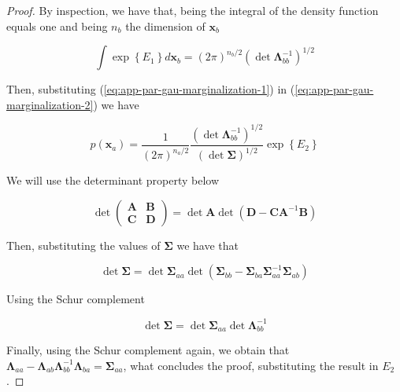 \begin{appendices}
\begin{proof}
    By inspection, we have that, being the integral of the density function equals one and being $n_b$ the dimension of $\mathbf{x}_b$

    \begin{equation}
      \label{eq:app-par-gau-marginalization-2}
      \int \exp \left\{ E_1 \right\} d \mathbf{x}_b = \left( 2 \pi \right)^{n_b/2} \left( \det \mathbf{\Lambda}_{bb}^{-1} \right) ^{1 / 2}
    \end{equation}

    Then, substituting (\ref{eq:app-par-gau-marginalization-1}) in (\ref{eq:app-par-gau-marginalization-2}) we have

    \begin{equation*}
      p\left(\mathbf{x}_{a}\right)=\frac{1}{(2 \pi)^{n_a / 2}} \frac{\left( \det \mathbf{\Lambda}_{bb}^{-1} \right) ^{1 / 2}}{ \left( \det \mathbf{\Sigma} \right) ^{1 / 2}} \exp \left\{ E_2 \right\}
    \end{equation*}

    We will use the determinant property below

    \begin{equation}
    \det \left(\begin{array}{cc}{\mathbf{A}} & \mathbf{B} \\ \mathbf{C} & \mathbf{D} \end{array}\right)=\det \mathbf{A} \det \left(\mathbf{D}-\mathbf{C A}^{-1} \mathbf{B}\right)
    \end{equation}

    Then, substituting the values of $\boldsymbol{\Sigma}$ we have that

    \begin{equation}
      \det \boldsymbol{\Sigma}=\det \boldsymbol{\Sigma}_{a a} \det\left(\boldsymbol{\Sigma}_{b b}-\boldsymbol{\Sigma}_{b a} \boldsymbol{\Sigma}_{a a}^{-1} \boldsymbol{\Sigma}_{a b}\right)
    \end{equation}

    Using the Schur complement

    \begin{equation}
      \det \boldsymbol{\Sigma}=\det \boldsymbol{\Sigma}_{a a} \det \boldsymbol{\Lambda}_{bb}^{-1}
    \end{equation}

    Finally, using the Schur complement again, we obtain that $\boldsymbol{\Lambda}_{a a}-\boldsymbol{\Lambda}_{a b} \boldsymbol{\Lambda}_{b b}^{-1} \boldsymbol{\Lambda}_{b a} = \boldsymbol{\Sigma}_{a a}$, what concludes the proof, substituting the result in $E_2$.
  \end{proof}


\end{appendices}
